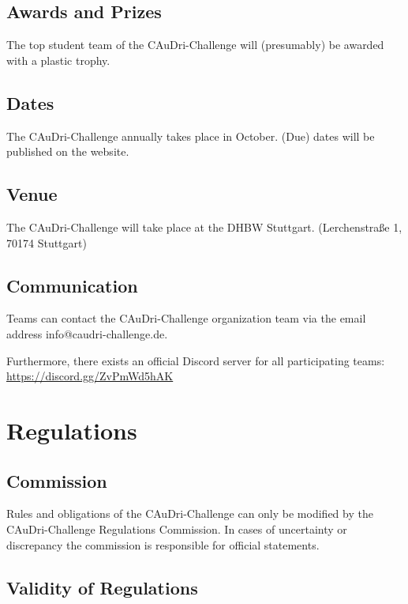 \documentclass[a4paper]{report}
\begin{document}
\section{Awards and Prizes}

The top student team of the CAuDri-Challenge will (presumably) be awarded with a plastic trophy. 

\section{Dates}

The CAuDri-Challenge annually takes place in October. (Due) dates will be published on the website. 

\section{Venue}

The CAuDri-Challenge will take place at the DHBW Stuttgart. (Lerchenstraße 1, 70174 Stuttgart) 

\section{Communication}

Teams can contact the CAuDri-Challenge organization team via the email address info@caudri-challenge.de. 

Furthermore, there exists an official Discord server for all participating teams:\\ \href{https://discord.gg/ZvPmWd5hAK}{https://discord.gg/ZvPmWd5hAK} 

\chapter{Regulations}

\section{Commission}

Rules and obligations of the CAuDri-Challenge can only be modified by the CAuDri-Challenge Regulations Commission. In cases of uncertainty or discrepancy the commission is responsible for official statements. 

\section{Validity of Regulations}
\end{document}

